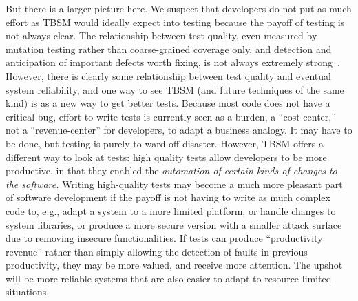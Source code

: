 But there is a larger picture here.  We suspect that developers do not put as much effort as TBSM would ideally expect into testing because the payoff of testing is not always clear.  The relationship between test quality, even measured by mutation testing rather than coarse-grained coverage only, and detection and anticipation of important defects worth fixing, is not always extremely strong~\cite{Testedness}.  However, there is clearly some relationship between test quality and eventual system reliability, and one way to see TBSM (and future techniques of the same kind) is as a new way to get better tests.  Because most code does not have a critical bug, effort to write tests is currently seen as a burden, a ``cost-center,'' not a ``revenue-center'' for developers, to adapt a business analogy.  It may have to be done, but testing is purely to ward off disaster.  However, TBSM offers a different way to look at tests:  high quality tests allow developers to be more productive, in that they enabled the \emph{automation of certain kinds of changes to the software.}  Writing high-quality tests may become a much more pleasant part of software development if the payoff is not having to write as much complex code to, e.g., adapt a system to a more limited platform, or handle changes to system libraries, or produce a more secure version with a smaller attack surface due to removing insecure functionalities.  If tests can produce ``productivity revenue'' rather than simply allowing the detection of faults in previous productivity, they may be more valued, and receive more attention.  The upshot will be more reliable systems that are also easier to adapt to resource-limited situations.
